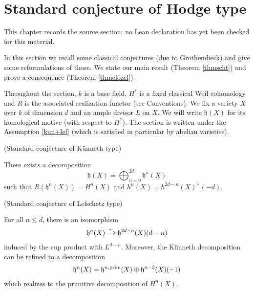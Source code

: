 \chapter{Standard conjecture of Hodge type}
\label{standard-conjectures-abelian-fourfolds-chapter-03}

\begin{remark}
\label{standard-conjectures-abelian-fourfolds-chapter-03-source}
This chapter records the source section; no Lean declaration has yet been checked for this material.
\notready
\end{remark}

In this section we recall some classical conjectures (due to Grothendieck) and give some reformulations of those. We state our main result (Theorem \ref{thmscht}) and prove a consequence (Theorem \ref{thmclozel}).

Throughout the section, $k$ is a base field, $H^*$ is a fixed classical Weil cohomology and $R$ is the associated realization functor (see Conventions). We fix a variety $X$  over $k$ of dimension $d$ and  an ample divisor $L$ on $X$. We will write $\mathfrak{h}(X)$ for its homological motive (with respect to $H^*$). The section is written under the Assumption \ref{kun+lef} (which is satisfied in particular by abelian varieties).

\begin{conj}
\notready\label{conjkun} (Standard conjecture of K\"unneth type)


 There exists a decomposition
\[\mathfrak{h}(X)=\bigoplus_{n=0}^{2d} \mathfrak{h}^n(X)\]
such that $R(\mathfrak{h}^n(X))=H^n(X)$ and $h^n(X)=h^{2d-n}(X)^{\vee}(-d).$
\end{conj}

\begin{conj}
\notready\label{conjlef} (Standard conjecture of Lefschetz type)

 For all $n \leq d$, there is an isomorphism
\[\mathfrak{h}^n(X) \xrightarrow{\sim } \mathfrak{h}^{2d-n}(X)(d-n)\]
induced by the cup product with $L^{d-n}$. Moreover, the K\"unneth decomposition can be refined to a  decomposition
\[\mathfrak{h}^n(X)= \mathfrak{h}^{n,\mathrm{prim}}(X)\oplus \mathfrak{h}^{n-2}(X)(-1)\]
 which realizes to the primitive decomposition of $H^n(X)$.
\end{conj}

